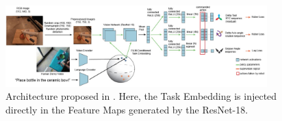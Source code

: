 \begin{figure}[t]
    \centering
    \includegraphics[width=0.9\textwidth]{figures/images/bc_z/bc-z-network.jpg}
    \caption{Architecture proposed in \cite{jang2022bc_z}. Here, the Task Embedding is injected directly in the Feature Maps generated by the ResNet-18.}
    \label{fig:bcz_architecture}
\end{figure}
